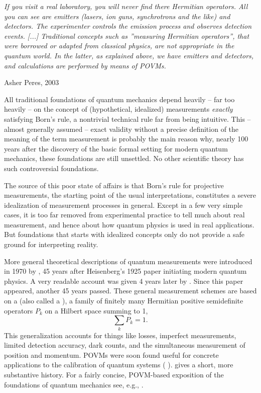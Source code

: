 \documentclass[12pt]{article}
\begin{document}
\bigskip


\nopagebreak
\hfill\parbox[t]{10.8cm}{\footnotesize

{\em
If you visit a real laboratory, you will never find there Hermitian
operators. All you can see are emitters (lasers, ion guns, synchrotrons
and the like) and detectors. The experimenter controls the emission
process and observes detection events. [...]
Traditional concepts such as ''measuring Hermitian operators'', that
were borrowed or adapted from classical physics, are not appropriate
in the quantum world. In the latter, as explained above, we have
emitters and detectors, and calculations are performed by means of
POVMs.}

\hfill Asher Peres, 2003 \cite[p.1545f]{Per2003}
}

\bigskip

All traditional foundations of quantum mechanics depend heavily  -- far
too heavily -- on the concept of (hypothetical, idealized) measurements
{\em exactly} satisfying Born's rule, a nontrivial technical rule far
from being intuitive. This -- almost generally assumed -- exact validity
without a precise definition of the meaning of the term measurement
is probably the main reason why, nearly 100 years after the discovery
of the basic formal setting for modern quantum mechanics, these
foundations are still unsettled. No other scientific theory has such
controversial foundations.

The source of this poor state of affairs is that Born's rule for
projective measurements, the starting point of the usual
interpretations, constitutes a severe idealization of measurement 
processes in general. Except in a few very simple cases, it is too far 
removed from experimental practice to tell much about real measurement, 
and hence about how quantum physics is used in real applications. But 
foundations that starts with idealized concepts only do not provide a 
safe ground for interpreting reality. 

More general theoretical descriptions of quantum measurements were
introduced in 1970 by  \cite{DavL}, 45 years after
Heisenberg's 1925 paper initiating modern quantum physics.  A very
readable account was given 4 years later by 
\cite{AliE.meas}. Since this paper appeared, another 45 years passed.
These general measurement schemes are based on a 
(also called a ),
a family of finitely many Hermitian positive semidefinite operators
$P_k$ on a Hilbert space summing to 1,
\[
\sum_k P_k=1.
\]
This generalization accounts for things like losses, imperfect
measurements, limited detection accuracy, dark counts, and the
simultaneous measurement of position and momentum. POVMs were soon found
useful for concrete applications to the calibration of quantum systems
( \cite{Hel}).  \cite{Bra} gives a short,
more substantive history. For a fairly concise, POVM-based
exposition of the foundations of quantum mechanics see, e.g.,
 \cite{Eng}.
\end{document}
